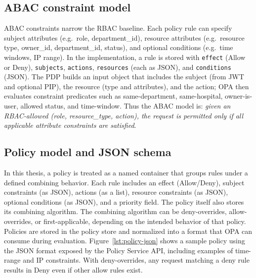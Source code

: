 \subsection{ABAC constraint model}
\label{sec:abac-constraint-model}
ABAC constraints narrow the RBAC baseline. Each policy rule can specify subject attributes (e.g.\ role, department\_id), resource attributes (e.g.\ resource type, owner\_id, department\_id, status), and optional conditions (e.g.\ time windows, IP range). In the implementation, a rule is stored with \texttt{effect} (Allow or Deny), \texttt{subjects}, \texttt{actions}, \texttt{resources} (each as JSON), and \texttt{conditions} (JSON). The PDP builds an input object that includes the subject (from JWT and optional PIP), the resource (type and attributes), and the action; OPA then evaluates constraint predicates such as same-department, same-hospital, owner-is-user, allowed status, and time-window. Thus the ABAC model is: \emph{given an RBAC-allowed (role, resource\_type, action), the request is permitted only if all applicable attribute constraints are satisfied}.


\subsection{Policy model and JSON schema}

In this thesis, a policy is treated as a named container that groups rules under a defined combining behavior. Each rule includes an effect (Allow/Deny), subject constraints (as JSON), actions (as a list), resource constraints (as JSON), optional conditions (as JSON), and a priority field. The policy itself also stores its combining algorithm. The combining algorithm can be deny-overrides, allow-overrides, or first-applicable, depending on the intended behavior of that policy. Policies are stored in the policy store and normalized into a format that OPA can consume during evaluation. Figure~\ref{lst:policy-json} shows a sample policy using the JSON format exposed by the Policy Service API, including examples of time-range and IP constraints. With deny-overrides, any request matching a deny rule results in Deny even if other allow rules exist.
\vspace{0.5cm}

